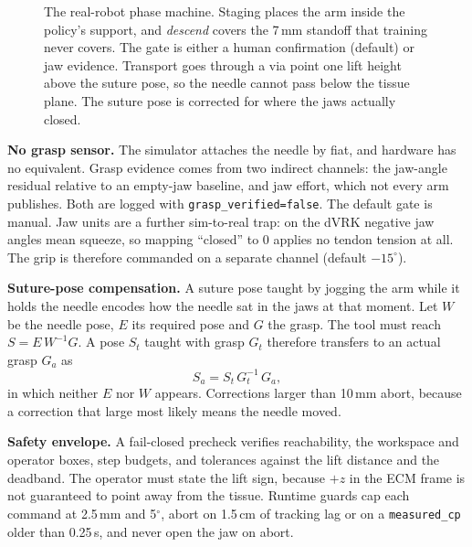 \documentclass[letterpaper, 10 pt, conference]{ieeeconf}  %
\begin{document}
\begin{figure}[t]
  \centering
  \resizebox{\columnwidth}{!}{}
  \caption{The real-robot phase machine. Staging places the arm inside the
  policy's support, and \emph{descend} covers the 7\,mm standoff that training
  never covers. The gate is either a human confirmation (default) or jaw
  evidence. Transport goes through a via point one lift height above the
  suture pose, so the needle cannot pass below the tissue plane. The suture
  pose is corrected for where the jaws actually closed.}
  \label{fig:phases}
\end{figure}

\textbf{No grasp sensor.} The simulator attaches the needle by fiat, and
hardware has no equivalent. Grasp evidence comes from two indirect channels:
the jaw-angle residual relative to an empty-jaw baseline, and jaw effort, which
not every arm publishes. Both are logged with \texttt{grasp\_verified=false}.
The default gate is manual. Jaw units are a further sim-to-real trap: on the
dVRK negative jaw angles mean squeeze, so mapping ``closed'' to 0 applies no
tendon tension at all. The grip is therefore commanded on a separate channel
(default $-15^\circ$).

\textbf{Suture-pose compensation.} A suture pose taught by jogging the arm
while it holds the needle encodes how the needle sat in the jaws at that
moment. Let $W$ be the needle pose, $E$ its required pose and $G$ the grasp.
The tool must reach $S=E\,W^{-1}G$. A pose $S_t$ taught with grasp $G_t$
therefore transfers to an actual grasp $G_a$ as
\begin{equation}
  S_a = S_t\,G_t^{-1}\,G_a ,
\end{equation}
in which neither $E$ nor $W$ appears. Corrections larger than 10\,mm abort,
because a correction that large most likely means the needle moved.

\textbf{Safety envelope.} A fail-closed precheck verifies reachability, the
workspace and operator boxes, step budgets, and tolerances against the lift
distance and the deadband. The operator must state the lift sign, because
$+z$ in the ECM frame is not guaranteed to point away from the tissue. Runtime
guards cap each command at 2.5\,mm and 5$^\circ$, abort on 1.5\,cm of tracking
lag or on a \texttt{measured\_cp} older than 0.25\,s, and never open the jaw on
abort.
\end{document}
